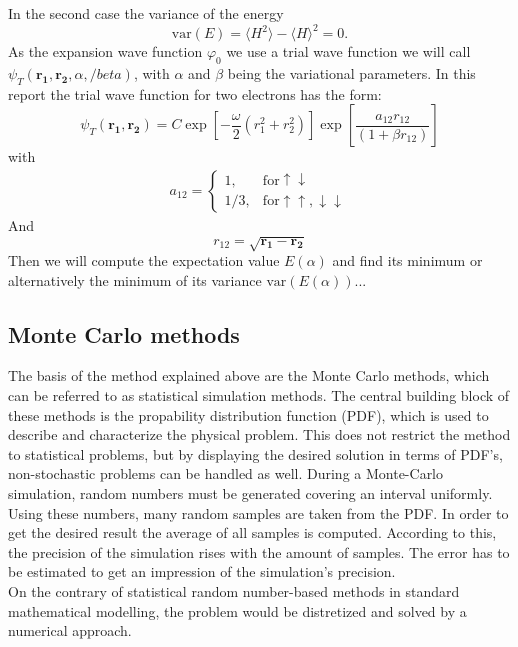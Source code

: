 In the second case the variance of the energy
\begin{equation}
\mathrm{var}(E) = \langle H^2 \rangle - \langle H\rangle^2 = 0.
\end{equation}
As the expansion wave function $\varphi_0$ we use a trial wave function we will call $\psi_T (\mathbf{r_1, r_2},\alpha, /beta)$, with $\alpha$ and $\beta$ being the variational parameters. In this report the trial wave function for two electrons has the form:
\begin{equation}
\psi_T(\mathbf{r_1,r_2}) = C \exp\left[-\frac{\omega}{2} (r_1^2+r_2^2)\right] \exp \left[ \frac{a_{12} r_{12}}{(1+\beta r_{12})} \right]
\end{equation}
with
\begin{align}
a_{12} =\left\{\begin{array}{cl} 1, & \mbox{for} \uparrow\downarrow\\ 1/3, & \mbox{for} \uparrow\uparrow,\downarrow\downarrow \end{array}\right.
\end{align}
And
\begin{equation}
r_{12} = \sqrt{\mathbf{r_1} - \mathbf{r_2}}
\end{equation}
 Then we will compute the expectation value $E(\alpha)$ and find its minimum or alternatively the minimum of its variance $\mathrm{var}(E(\alpha))$...
\subsection{Monte Carlo methods}
The basis of the method explained above are the Monte Carlo methods, which can be referred to as statistical simulation methods. The central building block of these methods is the propability distribution function (PDF), which is used to describe and characterize the physical problem. This does not restrict the method to statistical problems, but by displaying the desired solution in terms of PDF's, non-stochastic problems can be handled as well. During a Monte-Carlo simulation, random numbers must be generated covering an interval uniformly. Using these numbers, many random samples are taken from the PDF. In order to get the desired result the average of all samples is computed. According to this, the precision of the simulation rises with the amount of samples. The error has to be estimated to get an impression of the simulation's precision.\\
On the contrary of statistical random number-based methods in standard mathematical modelling, the problem would be distretized and solved by a numerical approach.\\
